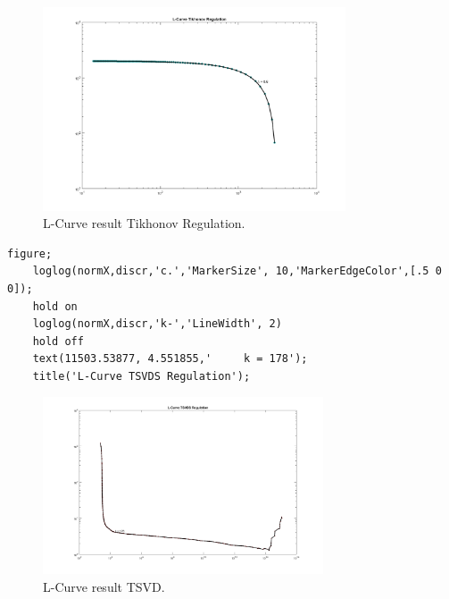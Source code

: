 \documentclass[a4paper,12pt]{article}
\begin{document}
\begin{figure}[H]
	\centering
	\includegraphics[width=0.8\textwidth]{lcurve_tk.png}
	\caption{L-Curve result Tikhonov Regulation.}
	\label{fig:ltk}
\end{figure}

\vspace{-2em}

\begin{lstlisting}[caption={MATLAB code for ploting Tikhonov Regularization L-Curve.}]
	figure;
	loglog(normX,discr,'c.','MarkerSize', 10,'MarkerEdgeColor',[.5 0 0]);
	hold on
	loglog(normX,discr,'k-','LineWidth', 2)
	hold off
	text(11503.53877, 4.551855,'     k = 178');
	title('L-Curve TSVDS Regulation');
\end{lstlisting}

\begin{figure}[H]
	\centering
	\includegraphics[width=0.74\textwidth]{lcurve_tsvd.png}
	\caption{L-Curve result TSVD.}
	\label{fig:ltsvd}
\end{figure}
\end{document}
